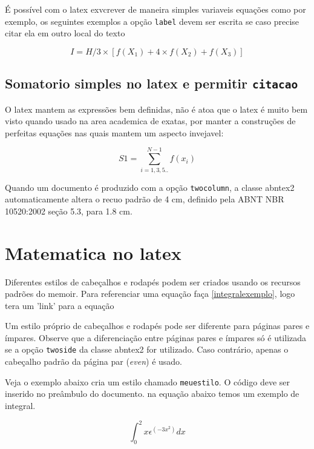\documentclass[
	article,			%
	11pt,				%
	oneside,			%
	a4paper,			%
	english,			%
	brazil,				%
	sumario=tradicional
	]{abntex2}
\begin{document}
É possível com o latex exvcrever de maneira simples variaveis equações
como por exemplo, os seguintes exemplos
a opção \texttt{label} devem ser escrita se caso precise citar ela em outro local do texto

\begin{equation} \label{equacaosimpson2}
I = H/3 \times [f(X_1) + 4 \times f(X_2) + f(X_3)]
\end{equation} 


\subsection{Somatorio simples no latex e permitir \texttt{citacao}}

O latex mantem as expressões bem definidas, não é atoa que o latex é muito bem
visto quando usado na area academica de exatas, por manter a construções de perfeitas
equações nas quais mantem um aspecto invejavel:

\begin{equation} \label{equacaosimpsons1}
S1 = \sum_{i = 1,3,5..}^{N-1} f(x_i)
\end{equation} 


Quando um documento é produzido com a opção \texttt{twocolumn}, a classe
\textsf{abntex2} automaticamente altera o recuo padrão de 4 cm, definido pela
ABNT NBR 10520:2002 seção 5.3, para 1.8 cm.

\section{Matematica no latex}

Diferentes estilos de cabeçalhos e rodapés podem ser criados usando os
recursos padrões do \textsf{memoir}.
Para referenciar uma equação faça \ref{integralexemplo}, logo tera um 'link'
para a equação

Um estilo próprio de cabeçalhos e rodapés pode ser diferente para páginas pares
e ímpares. Observe que a diferenciação entre páginas pares e ímpares só é
utilizada se a opção \texttt{twoside} da classe \textsf{abntex2} for utilizado.
Caso contrário, apenas o cabeçalho padrão da página par (\emph{even}) é usado.

Veja o exemplo abaixo cria um estilo chamado \texttt{meuestilo}. O código deve
ser inserido no preâmbulo do documento. na equação abaixo temos um exemplo de integral.



\begin{equation} \label{integralexemplo}
\int_{0}^{2}x\epsilon ^(-3x^2) dx
\end{equation} 
\end{document}
